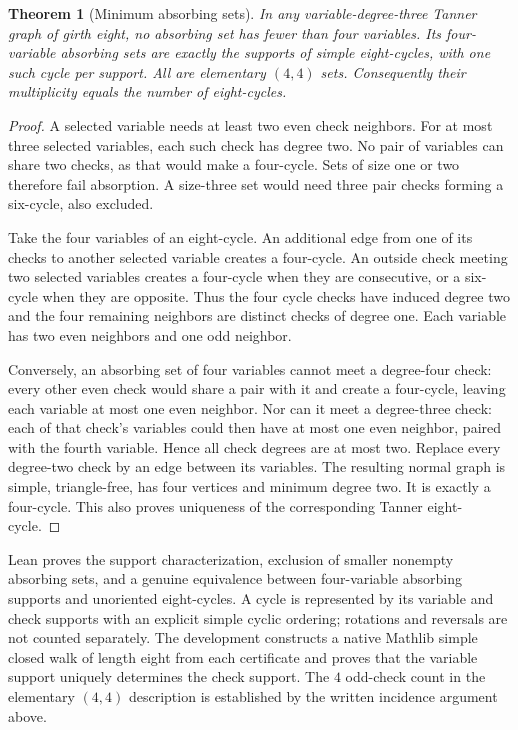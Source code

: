 \documentclass[11pt]{article}
\newtheorem{theorem}{Theorem}[section]
\theoremstyle{definition}
\theoremstyle{remark}
\begin{document}
\begin{theorem}[Minimum absorbing sets]\label{thm:absorbing}
In any variable-degree-three Tanner graph of girth eight, no absorbing set
has fewer than four variables. Its four-variable absorbing sets are
exactly the supports of simple eight-cycles, with one such cycle per
support. All are elementary $(4,4)$ sets. Consequently their multiplicity
equals the number of eight-cycles.
\end{theorem}
\begin{proof}
A selected variable needs at least two even check neighbors. For at most
three selected variables, each such check has degree two. No pair of
variables can share two checks, as that would make a four-cycle. Sets
of size one or two therefore fail absorption. A size-three set would
need three pair checks forming a six-cycle, also excluded.

Take the four variables of an eight-cycle. An additional edge from one
of its checks to another selected variable creates a four-cycle. An
outside check meeting two selected variables creates a four-cycle when
they are consecutive, or a six-cycle when they are opposite. Thus the
four cycle checks have induced degree two and the four remaining
neighbors are distinct checks of degree one. Each variable has two even
neighbors and one odd neighbor.

Conversely, an absorbing set of four variables cannot meet a degree-four
check: every other even check would share a pair with it and create a
four-cycle, leaving each variable at most one even neighbor. Nor can it
meet a degree-three check: each of that check's variables could then have
at most one even neighbor, paired with the fourth variable. Hence all
check degrees are at most two. Replace every degree-two check by an edge
between its variables. The resulting normal graph is simple, triangle-free,
has four vertices and minimum degree two. It is exactly a four-cycle.
This also proves uniqueness of the corresponding Tanner eight-cycle.
\end{proof}

Lean proves the support characterization, exclusion of smaller nonempty
absorbing sets, and a genuine equivalence between four-variable absorbing
supports and unoriented eight-cycles. A cycle is represented by its variable
and check supports with an explicit simple cyclic ordering; rotations and
reversals are not counted separately. The development constructs a native
Mathlib simple closed walk of length eight from each certificate and proves
that the variable support uniquely determines the check support. The
$4$ odd-check count in the elementary $(4,4)$ description is established
by the written incidence argument above.
\end{document}

